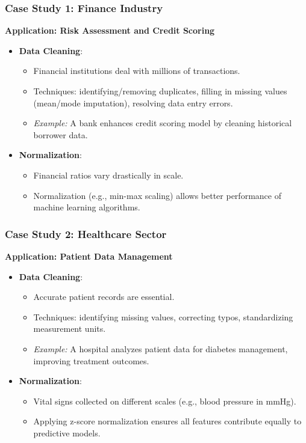 \documentclass{beamer}
\begin{document}
\begin{frame}[fragile]
    \frametitle{Case Study 1: Finance Industry}
    \textbf{Application: Risk Assessment and Credit Scoring}
    \begin{itemize}
        \item \textbf{Data Cleaning}:
            \begin{itemize}
                \item Financial institutions deal with millions of transactions.
                \item Techniques: identifying/removing duplicates, filling in missing values (mean/mode imputation), resolving data entry errors.
                \item \textit{Example:} A bank enhances credit scoring model by cleaning historical borrower data.
            \end{itemize}
        \item \textbf{Normalization}:
            \begin{itemize}
                \item Financial ratios vary drastically in scale.
                \item Normalization (e.g., min-max scaling) allows better performance of machine learning algorithms.
            \end{itemize}
    \end{itemize}
\end{frame}

\begin{frame}[fragile]
    \frametitle{Case Study 2: Healthcare Sector}
    \textbf{Application: Patient Data Management}
    \begin{itemize}
        \item \textbf{Data Cleaning}:
            \begin{itemize}
                \item Accurate patient records are essential.
                \item Techniques: identifying missing values, correcting typos, standardizing measurement units.
                \item \textit{Example:} A hospital analyzes patient data for diabetes management, improving treatment outcomes.
            \end{itemize}
        \item \textbf{Normalization}:
            \begin{itemize}
                \item Vital signs collected on different scales (e.g., blood pressure in mmHg).
                \item Applying z-score normalization ensures all features contribute equally to predictive models.
            \end{itemize}
    \end{itemize}
\end{frame}
\end{document}
